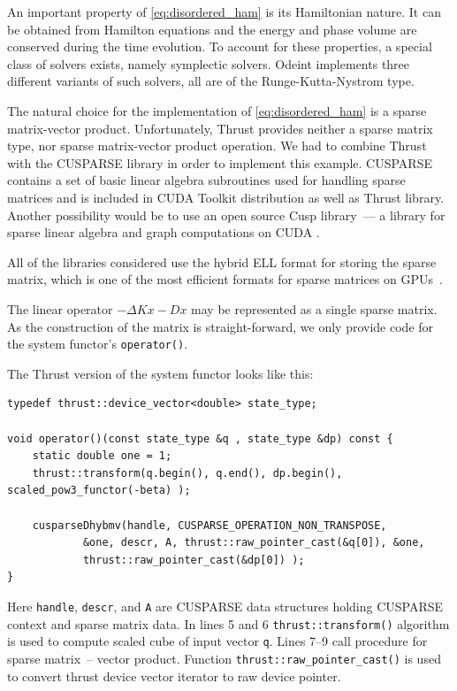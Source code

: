 \documentclass[1p]{elsarticle}
\newcommand{\code}[1]{\lstinline|#1|}
\begin{document}
An important property of \eqref{eq:disordered_ham} is its Hamiltonian
nature. It can be obtained from Hamilton equations and the energy and
phase volume are conserved during the time evolution. To account for
these properties, a special class of solvers exists, namely symplectic
solvers. Odeint implements three different variants of such solvers,
all are of the Runge-Kutta-Nystrom type.



The natural choice for the implementation of \eqref{eq:disordered_ham} is a
sparse matrix-vector product. Unfortunately, Thrust provides neither a sparse
matrix type, nor sparse matrix-vector product operation.  We had to combine
Thrust with the CUSPARSE library in order to implement this example. CUSPARSE
contains a set of basic linear algebra subroutines used for handling sparse
matrices and is included in CUDA Toolkit distribution as well as Thrust
library. Another possibility would be to use an open source Cusp library~--- a
library for sparse linear algebra and graph computations on CUDA
\cite{CuspRef}.

All of the libraries considered use the hybrid
ELL format for storing the sparse matrix, which is one of the most efficient formats for sparse matrices on
GPUs~\cite{BellGarland2008}.

The linear operator $-\Delta Kx-Dx$ may be represented as a single sparse matrix.
As the construction of the matrix is straight-forward, we only provide code for the system functor's \code{operator()}.

The Thrust version of the system functor looks like this:
\begin{lstlisting}
typedef thrust::device_vector<double> state_type;

void operator()(const state_type &q , state_type &dp) const {
    static double one = 1;
    thrust::transform(q.begin(), q.end(), dp.begin(), scaled_pow3_functor(-beta) );

    cusparseDhybmv(handle, CUSPARSE_OPERATION_NON_TRANSPOSE,
            &one, descr, A, thrust::raw_pointer_cast(&q[0]), &one,
            thrust::raw_pointer_cast(&dp[0]) );
}
\end{lstlisting}
Here \code{handle}, \code{descr}, and \code{A} are CUSPARSE data structures
holding CUSPARSE context and sparse matrix data. In lines 5 and 6
\code{thrust::transform()} algorithm is used to compute scaled cube of input
vector \code{q}. Lines 7--9 call procedure for sparse matrix~-- vector product.
Function \code{thrust::raw_pointer_cast()} is used to convert thrust device
vector iterator to raw device pointer.
\end{document}
